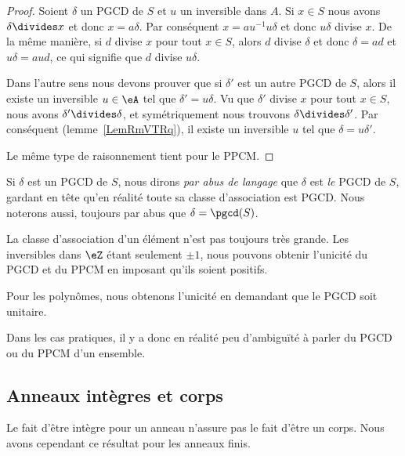 \begin{proof}
    Soient \( \delta\) un PGCD de \( S\) et \( u\) un inversible dans \( A\). Si \( x\in S\) nous avons \( \delta\divides x\) et donc \( x=a\delta\). Par conséquent \( x=au^{-1}u\delta\) et donc \( u\delta\) divise \( x\). De la même manière, si \( d\) divise \( x\) pour tout \( x\in S\), alors \( d\) divise \( \delta\) et donc \( \delta=ad\) et \( u\delta=aud\), ce qui signifie que \( d\) divise \( u\delta\).

    Dans l'autre sens nous devons prouver que si \( \delta'\) est un autre PGCD de \( S\), alors il existe un inversible \( u\in \eA\) tel que \( \delta'=u\delta\). Vu que \( \delta'\) divise \( x\) pour tout \( x\in S\), nous avons \( \delta'\divides \delta\), et symétriquement nous trouvons \( \delta\divides\delta'\). Par conséquent (lemme~\ref{LemRmVTRq}), il existe un inversible \( u\) tel que \( \delta=u\delta'\).

    Le même type de raisonnement tient pour le PPCM.
\end{proof}

Si \( \delta\) est un PGCD de \( S\), nous dirons \emph{par abus de langage} que \( \delta\) est \emph{le} PGCD de \( S\), gardant en tête qu'en réalité toute sa classe d'association est PGCD. Nous noterons aussi, toujours par abus que \( \delta=\pgcd(S)\).

\begin{remark}
    La classe d'association d'un élément n'est pas toujours très grande. Les inversibles dans \( \eZ\) étant seulement \( \pm 1\), nous pouvons obtenir l'unicité du PGCD et du PPCM en imposant qu'ils soient positifs.

    Pour les polynômes, nous obtenons l'unicité en demandant que le PGCD soit unitaire.

    Dans les cas pratiques, il y a donc en réalité peu d'ambiguïté à parler du PGCD ou du PPCM d'un ensemble.
\end{remark}

\subsection{Anneaux intègres et corps}

Le fait d'être intègre pour un anneau n'assure pas le fait d'être un corps. Nous avons cependant ce résultat pour les anneaux finis.

